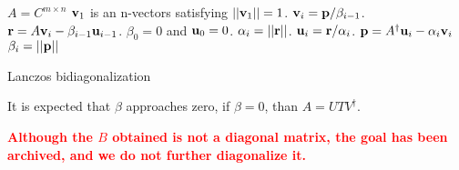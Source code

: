 \begin{algorithm}[H]
\begin{algorithmic}
\State $A=C^{m\times n}$
\State ${\bf v}_1$ is an n-vectors satisfying $||{\bf v} _1|| =1$.
        \State ${\bf v}_i ={\bf p }/\beta _{i-1}$.
    \EndIf
    \State ${\bf r}=A{\bf v}_i - \beta _{i-1}{\bf u}_{i - 1}$.
    \Comment $\beta _0 = 0$ and ${\bf u}_0=0$.
    \State $\alpha _i = ||{\bf r}||$.
    \State ${\bf u}_i = {\bf r}/\alpha _i$.
        \State ${\bf p} =A^{\dagger}{\bf u}_i - \alpha _i {\bf v}_i$
        \State $\beta _i = ||{\bf p}||$
    \EndIf
\EndFor
\end{algorithmic}
\caption{\label{alg.LanczosBiorthogonalization1}Lanczos bidiagonalization}
\end{algorithm}

It is expected that $\beta$ approaches zero, if $\beta = 0$, than $A= UT V^{\dagger}$.

\textbf{\textcolor{red}{Although the $B$ obtained is not a diagonal matrix, the goal has been archived, and we do not further diagonalize it.}}
